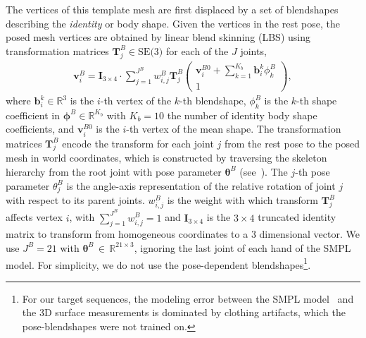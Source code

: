 The vertices of this template mesh are first displaced by a set of blendshapes describing the {\em identity} or body shape. Given the vertices in the rest pose, the posed mesh vertices are obtained by linear blend skinning (LBS) using transformation matrices $\mathbf{T}^B_j\in \textrm{SE(3)}$ for each of the $J$ joints,
\begin{align}
\mathbf{v}_i^B= \mathbf{I}_{3\times 4} \cdot \sum_{j=1}^{J^B} w^B_{i,j}\mathbf{T}^B_j\begin{pmatrix} \mathbf{v}^{B0}_i + \sum_{k=1}^{K_b} \mathbf{b}^k_{i} \phi^B_k \\ 1 \end{pmatrix},
\label{eq:full_lbs_pose}
\end{align}
where $\mathbf{b}^k_{i}\in\mathds{R}^3$ is the $i$-th vertex of the $k$-th blendshape, $\phi^B_k$ is the $k$-th shape coefficient in $\boldsymbol{\phi}^B\in\mathds{R}^{K_b}$ with $K_b{=}10$ the number of identity body shape coefficients, and $\mathbf{v}^{B0}_i$ is the $i$-th vertex of the mean shape. The transformation matrices $\mathbf{T}^B_j$ encode the transform for each joint $j$ from the rest pose to the posed mesh in world coordinates, which is constructed by traversing the skeleton hierarchy from the root joint with pose parameter $\boldsymbol{\theta}^B$ (see~\cite{Loper2015}). The $j$-th pose parameter $\theta^B_j$ is the angle-axis representation of the relative rotation of joint $j$ with respect to its parent joints. $w^B_{i,j}$ is the weight with which transform $\mathbf{T}^B_j$ affects vertex $i$, with $\sum_{j=1}^{J^B}w^B_{i,j}{=}1$ and $\mathbf{I}_{3\times 4}$ is the $3{\times} 4$ truncated identity matrix to transform from homogeneous coordinates to a $3$ dimensional vector. We use $J^B{=}21$ with $\boldsymbol{\theta}^B \,{\in}\, \mathds{R}^{21{\times}3}$, ignoring the last joint of each hand of the SMPL model. For simplicity, we do not use the pose-dependent blendshapes\footnote{For our target sequences, the modeling error between the SMPL model~\cite{Loper2015} and the 3D surface measurements is dominated by clothing artifacts, which the pose-blendshapes were not trained on.}.

